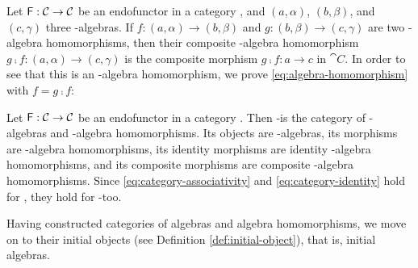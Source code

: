\begin{definition}
  \label{def:composite-algebra-homomorphism}

  Let $\mathsf{F}: \mathcal{C} \to \mathcal{C}$ be an endofunctor in a category
  , and $(a,\alpha)$, $(b,\beta)$, and $(c,\gamma)$ three
  -algebras. If $f: (a,\alpha) \to (b,\beta)$ and $g:
  (b,\beta) \to (c,\gamma)$ are two -algebra homomorphisms,
  then their composite -algebra homomorphism $g \comp f:
  (a,\alpha) \to (c,\gamma)$ is the composite morphism $g \comp f: a
  \to c$ in $\cat{C}$. In order to see that this is an
  -algebra homomorphism, we prove
  \eqref{eq:algebra-homomorphism} with $f = g \comp f$:
  \begin{steps}
      \eqby{\eqref{eq:functor-composition}}
      \eqby{\eqref{eq:algebra-homomorphism}}
  \end{steps}

\end{definition}

\begin{definition}
  \label{def:category-alg}


  Let $\mathsf{F}: \mathcal{C} \to \mathcal{C}$ be an endofunctor in a category
  . Then -\alg is the category of -algebras and
  -algebra homomorphisms. Its objects are -algebras,
  its morphisms are -algebra homomorphisms, its identity
  morphisms are identity -algebra homomorphisms, and its
  composite morphisms are composite -algebra homomorphisms.
  Since \eqref{eq:category-associativity} and
  \eqref{eq:category-identity} hold for , they hold for
  -\alg too.

\end{definition}

Having constructed categories of algebras and algebra homomorphisms,
we move on to their initial objects (see Definition
\ref{def:initial-object}), that is, initial algebras.


